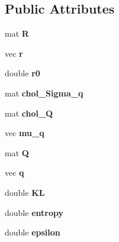 \subsection*{Public Attributes}
\begin{DoxyCompactItemize}
\item 
mat {\bfseries R}\hypertarget{classMore_a433b935746584a3f575aaad0a4dff676}{}\label{classMore_a433b935746584a3f575aaad0a4dff676}

\item 
vec {\bfseries r}\hypertarget{classMore_abd58e2c611fcd0ba19ff1827de13a079}{}\label{classMore_abd58e2c611fcd0ba19ff1827de13a079}

\item 
double {\bfseries r0}\hypertarget{classMore_af13af649eb7ab142565c7138654638e7}{}\label{classMore_af13af649eb7ab142565c7138654638e7}

\item 
mat {\bfseries chol\+\_\+\+Sigma\+\_\+q}\hypertarget{classMore_aea252b6789078d0db3151f7b91d6b14d}{}\label{classMore_aea252b6789078d0db3151f7b91d6b14d}

\item 
mat {\bfseries chol\+\_\+Q}\hypertarget{classMore_a4d98cd1335ad9eb1e6eb3dcb491392f9}{}\label{classMore_a4d98cd1335ad9eb1e6eb3dcb491392f9}

\item 
vec {\bfseries mu\+\_\+q}\hypertarget{classMore_a44d06b5bef43614da37f03cee8b49f7b}{}\label{classMore_a44d06b5bef43614da37f03cee8b49f7b}

\item 
mat {\bfseries Q}\hypertarget{classMore_a5a81408e0bb2ac67f25f7dc80fdb638c}{}\label{classMore_a5a81408e0bb2ac67f25f7dc80fdb638c}

\item 
vec {\bfseries q}\hypertarget{classMore_a646ac6513d1490b21f20c869eff874d9}{}\label{classMore_a646ac6513d1490b21f20c869eff874d9}

\item 
double {\bfseries KL}\hypertarget{classMore_af24998dba5d26095ce9427aed6d173e6}{}\label{classMore_af24998dba5d26095ce9427aed6d173e6}

\item 
double {\bfseries entropy}\hypertarget{classMore_a59f91914871f4a0651c85169b9c2fc80}{}\label{classMore_a59f91914871f4a0651c85169b9c2fc80}

\item 
double {\bfseries epsilon}\hypertarget{classMore_a00c64aa141fcdcbcb3e3c6faac735678}{}\label{classMore_a00c64aa141fcdcbcb3e3c6faac735678}


\end{DoxyCompactItemize}
